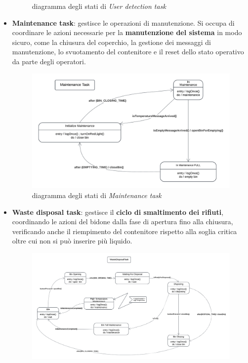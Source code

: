 \documentclass{report}
\begin{document}
\begin{itemize}
{\begin{figure}[H]
        \caption{diagramma degli stati di \textit{User detection task}}
        \label{fig:detection-task}
    \end{figure}
    }
    \item {
    \textbf{Maintenance task}: gestisce le operazioni di manutenzione. Si occupa di coordinare le azioni necessarie per la \textbf{manutenzione del sistema} in modo sicuro, come la chiusura del coperchio, la gestione dei messaggi di manutenzione, lo svuotamento del contenitore e il reset dello stato operativo da parte degli operatori.
    \begin{figure}[H]
        \centering
        \includegraphics[width=\linewidth]{img/assignment-02/Diagrammi per IOT - MaintenanceTask.png}
        \caption{diagramma degli stati di \textit{Maintenance task}}
        \label{fig:maintenance-task}
    \end{figure}
    }
    \item {
    \textbf{Waste disposal task}: gestisce il \textbf{ciclo di smaltimento dei rifiuti}, coordinando le azioni del bidone dalla fase di apertura fino alla chiusura, verificando anche il riempimento del contenitore rispetto alla soglia critica oltre cui non si può inserire più liquido.
    \begin{figure}[H]
        \centering
        \includegraphics[width=1.2\linewidth]{img/assignment-02/Diagrammi per IOT - WasteDisposalTask.png}

\end{figure}}
\end{itemize}
\end{document}
